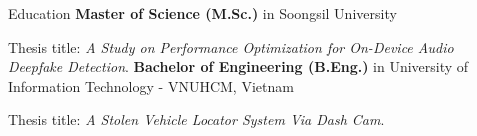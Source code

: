 \begin{rubric}{Education}
%
\entry*[2023 -- 2025]%
\textbf{Master of Science (M.Sc.)} in Soongsil University\par
	Thesis title: \emph{A Study on Performance Optimization for On-Device Audio Deepfake Detection}.
% 
\entry*[2018 -- 2023]%
\textbf{Bachelor of Engineering (B.Eng.)} in University of Information Technology - VNUHCM, Vietnam\par
	Thesis title: \emph{A Stolen Vehicle Locator System Via Dash Cam}.
\end{rubric}
